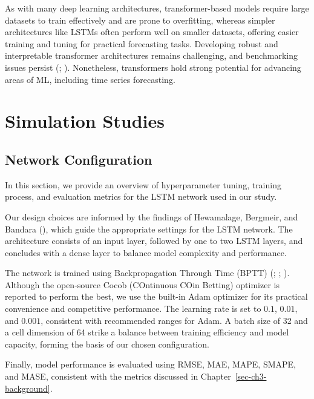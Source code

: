 \documentclass[
  letterpaper,
  double,
  12pt,
  1.0in]{beavtex}
\begin{document}
As with many deep learning architectures, transformer-based models
require large datasets to train effectively and are prone to
overfitting, whereas simpler architectures like LSTMs often perform well
on smaller datasets, offering easier training and tuning for practical
forecasting tasks. Developing robust and interpretable transformer
architectures remains challenging, and benchmarking issues persist
(; ).
Nonetheless, transformers hold strong potential for advancing areas of
ML, including time series forecasting.

\chapter{Simulation Studies}\label{sec-ch3-simu}

\section{Network Configuration}\label{network-configuration}

In this section, we provide an overview of hyperparameter tuning,
training process, and evaluation metrics for the LSTM network used in
our study.

Our design choices are informed by the findings of Hewamalage, Bergmeir,
and Bandara (), which guide
the appropriate settings for the LSTM network. The architecture consists
of an input layer, followed by one to two LSTM layers, and concludes
with a dense layer to balance model complexity and performance.

The network is trained using Backpropagation Through Time (BPTT)
(;
;
). Although
the open-source Cocob (COntinuous COin Betting) optimizer is reported to
perform the best, we use the built-in Adam optimizer for its practical
convenience and competitive performance. The learning rate is set to
\(0.1\), \(0.01\), and \(0.001\), consistent with recommended ranges for
Adam. A batch size of 32 and a cell dimension of 64 strike a balance
between training efficiency and model capacity, forming the basis of our
chosen configuration.

Finally, model performance is evaluated using RMSE, MAE, MAPE, SMAPE,
and MASE, consistent with the metrics discussed in
Chapter~\ref{sec-ch3-background}.
\end{document}
